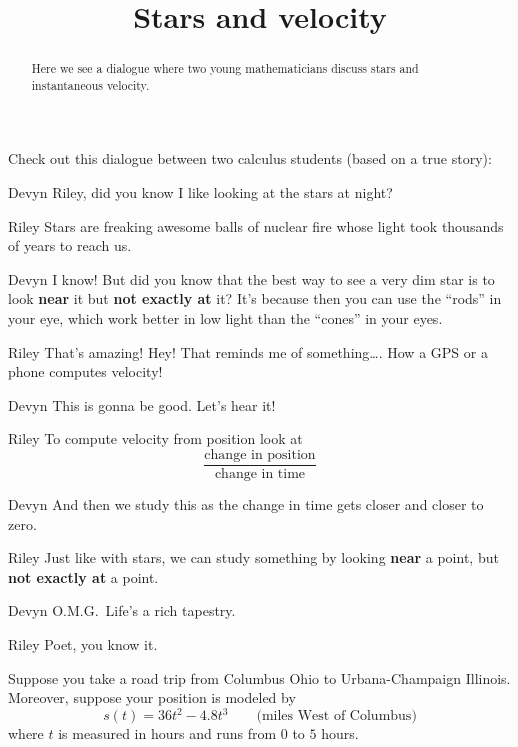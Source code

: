\documentclass{ximera}
\title[Break-Ground:]{Stars and velocity}
\begin{document}
\begin{abstract}
Here we see a dialogue where two young mathematicians discuss stars
and instantaneous velocity.
\end{abstract}
\maketitle

Check out this dialogue between two calculus students (based on a true
story):

\begin{dialogue}
\item[Devyn] Riley, did you know I like looking at the stars at night?
\item[Riley] Stars are freaking awesome balls of nuclear fire whose
  light took thousands of years to reach us.
\item[Devyn] I know! But did you know that the best way to see a very
  dim star is to look \textbf{near} it but \textbf{not exactly at} it? It's
  because then you can use the ``rods'' in your eye, which work better
  in low light than the ``cones'' in your eyes.
\item[Riley] That's amazing! Hey! That reminds me of something\dots.
  How a GPS or a phone computes velocity!
\item[Devyn] This is gonna be good. Let's hear it!
\item[Riley] To compute velocity from position look at
  \[
  \frac{\text{change in position}}{\text{change in time}}
  \]
\item[Devyn] And then we study this as the change in time gets closer
  and closer to zero.
\item[Riley] Just like with stars, we can study something by looking
  \textbf{near} a point, but \textbf{not exactly at} a point.
\item[Devyn] O.M.G.\ Life's a rich tapestry.
\item[Riley] Poet, you know it.
\end{dialogue}


\begin{problem}
  Suppose you take a road trip from Columbus Ohio to Urbana-Champaign
  Illinois. Moreover, suppose your position is modeled by
  \[
  s(t) = 36t^2 -4.8t^3 \qquad\text{(miles West of Columbus)} %
  \]
  where $t$ is measured in hours and runs from $0$ to $5$ hours. 
\end{problem}
\end{document}
